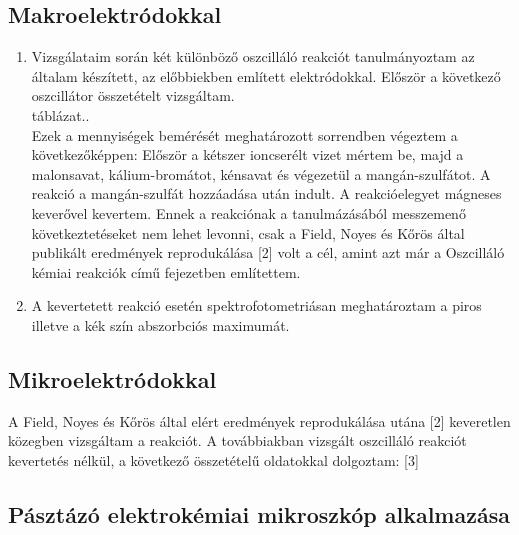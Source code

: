 \subsection{Makroelektródokkal}
\begin{enumerate}
\item Vizsgálataim során két különböző oszcilláló reakciót tanulmányoztam az általam készített, az előbbiekben említett elektródokkal. 
Először a következő oszcillátor összetételt vizsgáltam.\\
táblázat..\\
Ezek a mennyiségek bemérését meghatározott sorrendben végeztem a következőképpen: Először a kétszer ioncserélt vizet mértem be, majd a malonsavat, kálium-bromátot, kénsavat és végezetül a mangán-szulfátot. A reakció a mangán-szulfát hozzáadása után indult. A reakcióelegyet mágneses keverővel kevertem. Ennek a reakciónak a tanulmázásából messzemenő következtetéseket nem lehet levonni, csak a Field, Noyes és Kőrös által publikált eredmények reprodukálása [2] volt a cél, amint azt már a Oszcilláló kémiai reakciók című fejezetben említettem.
\item A kevertetett reakció esetén spektrofotometriásan meghatároztam a piros illetve a kék szín abszorbciós maximumát.
\end{enumerate}

\subsection{Mikroelektródokkal} 

A Field, Noyes és Kőrös által elért eredmények reprodukálása utána [2] keveretlen közegben vizsgáltam a reakciót.
A továbbiakban vizsgált oszcilláló reakciót kevertetés nélkül, a következő összetételű oldatokkal dolgoztam: [3]

\subsection{Pásztázó elektrokémiai mikroszkóp alkalmazása}



